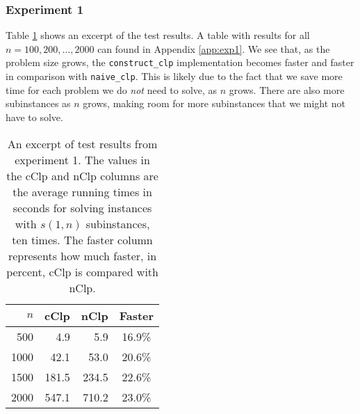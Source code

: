 \subsubsection{Experiment 1}
Table \ref{table:expone} shows an excerpt of the test results.
A table with results for all $n=100,200,\ldots,2000$ can found in Appendix
\ref{app:exp1}.
We see that, as the problem size grows, the \texttt{construct\_clp}
implementation becomes faster and faster in comparison with
\texttt{naive\_clp}.
This is likely due to the fact that we save more time for each problem we do
\emph{not} need to solve, as $n$ grows. There are also more subinstances as
$n$ grows, making room for more subinstances that we might not have to solve.

\begin{table}[ht!]
    \centering
    \caption{An excerpt of test results from experiment 1. The values in the
             cClp and nClp columns are the average running times in seconds for
             solving instances with $s(1, n)$ subinstances, ten times. The
             faster column represents how much faster, in percent, cClp is
             compared with nClp.}
    \label{table:expone}
\begin{tabular}{rrrc}
    $n$ & cClp  & nClp  & Faster \\ \hline
    500 & 4.9   & 5.9   & 16.9\% \\
   1000 & 42.1  & 53.0  & 20.6\% \\
   1500 & 181.5 & 234.5 & 22.6\% \\
   2000 & 547.1 & 710.2 & 23.0\%
\end{tabular}
\end{table}

